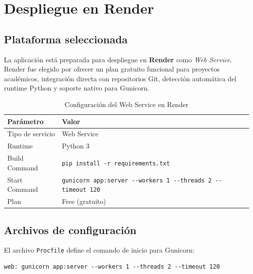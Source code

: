 \documentclass[a4paper,12pt]{report}
\numberwithin{equation}{chapter}
\numberwithin{figure}{chapter}
\numberwithin{table}{chapter}
\begin{document}


\chapter{Despliegue en Render}\label{chap:despliegue}

\section{Plataforma seleccionada}

La aplicación está preparada para despliegue en \textbf{Render} como \textit{Web Service}. Render fue elegido por ofrecer un plan gratuito funcional para proyectos académicos, integración directa con repositorios Git, detección automática del runtime Python y soporte nativo para Gunicorn.

\begin{table}[H]
    \centering
    \caption{Configuración del Web Service en Render}
    \label{tab:render}
    \begin{tabular}{ll}
        \toprule
        \textbf{Parámetro} & \textbf{Valor} \\
        \midrule
        Tipo de servicio  & Web Service \\
        Runtime           & Python 3 \\
        Build Command     & \texttt{pip install -r requirements.txt} \\
        Start Command     & \texttt{gunicorn app:server -{}-workers 1 -{}-threads 2 -{}-timeout 120} \\
        Plan              & Free (gratuito) \\
        \bottomrule
    \end{tabular}
\end{table}

\section{Archivos de configuración}

El archivo \texttt{Procfile} define el comando de inicio para Gunicorn:

\begin{lstlisting}[language={}, caption={Procfile para Render}, label={lst:procfile}]
web: gunicorn app:server --workers 1 --threads 2 --timeout 120
\end{lstlisting}
\end{document}
